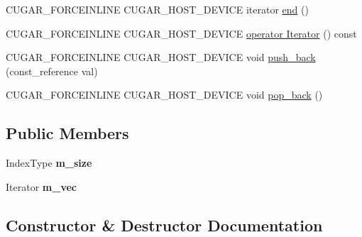 \begin{DoxyCompactItemize}
\item 
C\+U\+G\+A\+R\+\_\+\+F\+O\+R\+C\+E\+I\+N\+L\+I\+NE C\+U\+G\+A\+R\+\_\+\+H\+O\+S\+T\+\_\+\+D\+E\+V\+I\+CE iterator \hyperlink{structcugar_1_1vector__view_a3d34bf66c1ee2cb7dccf53b7dc58e2a2}{end} ()
\item 
C\+U\+G\+A\+R\+\_\+\+F\+O\+R\+C\+E\+I\+N\+L\+I\+NE C\+U\+G\+A\+R\+\_\+\+H\+O\+S\+T\+\_\+\+D\+E\+V\+I\+CE \hyperlink{structcugar_1_1vector__view_a75d37990f826ddc16faa41424d2db89c}{operator Iterator} () const
\item 
C\+U\+G\+A\+R\+\_\+\+F\+O\+R\+C\+E\+I\+N\+L\+I\+NE C\+U\+G\+A\+R\+\_\+\+H\+O\+S\+T\+\_\+\+D\+E\+V\+I\+CE void \hyperlink{structcugar_1_1vector__view_a631505b61ddcb11f2e82984561289b37}{push\+\_\+back} (const\+\_\+reference val)
\item 
C\+U\+G\+A\+R\+\_\+\+F\+O\+R\+C\+E\+I\+N\+L\+I\+NE C\+U\+G\+A\+R\+\_\+\+H\+O\+S\+T\+\_\+\+D\+E\+V\+I\+CE void \hyperlink{structcugar_1_1vector__view_ab1466b027a90a72d8727fcdf32191048}{pop\+\_\+back} ()
\end{DoxyCompactItemize}
\subsection*{Public Members}
\begin{DoxyCompactItemize}
\item 
\mbox{\label{structcugar_1_1vector__view_a04006575e7b935e3b1d10b9e253a1a25}} 
Index\+Type {\bfseries m\+\_\+size}
\item 
\mbox{\label{structcugar_1_1vector__view_adada6ba306cbd09caf2bfbeb8e923ff1}} 
Iterator {\bfseries m\+\_\+vec}
\end{DoxyCompactItemize}


\subsection{Constructor \& Destructor Documentation}
\mbox{\label{structcugar_1_1vector__view_af85824a098e4639d61a92e8fedd18eeb}} 
